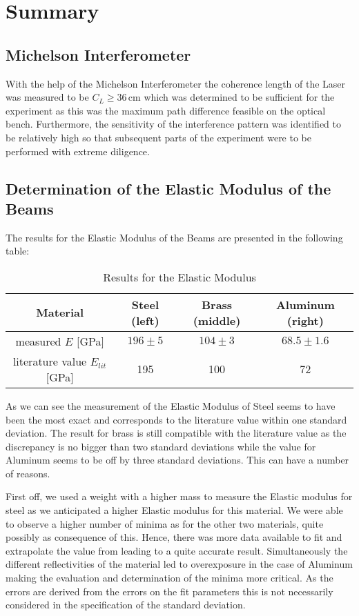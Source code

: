 \section{Summary}

\subsection{Michelson Interferometer}

With the help of the Michelson Interferometer the coherence length of the Laser was measured to be $C_L \geq 36\,\mathrm{cm}$ which was determined to be sufficient for the experiment as this was the maximum path difference feasible on the optical bench. Furthermore, the sensitivity of the interference pattern was identified to be relatively high so that subsequent parts of the experiment were to be performed with extreme diligence.

\subsection{Determination of the Elastic Modulus of the Beams}

The results for the Elastic Modulus of the Beams are presented in the following table:

\begin{table}[h!]
	\centering
	\begin{tabular}{c|c|c|c}
		Material							& Steel (left)	& Brass (middle)	& Aluminum (right)\\ \hline\hline
		measured $E$ [GPa]			& $196\pm5$	& 	$104\pm3$		& $68.5\pm1.6$			\\ \hline
	literature value \cite{staats} $E_{lit}$ [GPa]	& 195			& 100				& 72
	\end{tabular}
	\caption{Results for the Elastic Modulus}
\end{table}

As we can see the measurement of the Elastic Modulus of Steel seems to have been the most exact and corresponds to the literature value within one standard deviation.  The result for brass is still compatible with the literature value as the discrepancy is no bigger than two standard deviations while the value for Aluminum seems to be off by three standard deviations. This can have a number of reasons.

First off, we used a weight with a higher mass to measure the Elastic modulus for steel as we anticipated a higher Elastic modulus for this material. We were able to observe a higher number of minima as for the other two materials, quite possibly as consequence of this. Hence, there was more data available to fit and extrapolate the value from leading to a quite accurate result.
Simultaneously the different reflectivities of the material led to overexposure in the case of Aluminum making the evaluation and determination of the minima more critical. As the errors are derived from the errors on the fit parameters this is not necessarily considered in the specification of the standard deviation. 